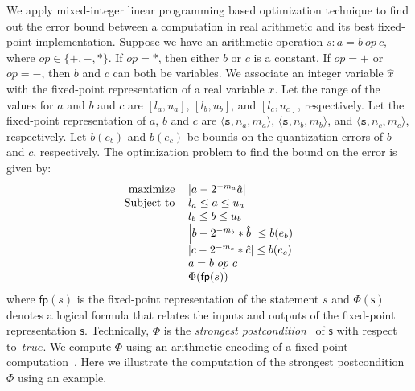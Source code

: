 \documentclass{amsart}
\numberwithin{equation}{section}
\def\set#1{{ \{ #1 \}}}
\def\tuple#1{{ \langle #1 \rangle}}
\def\true{{\mathit{true}}}
\begin{document}
We apply mixed-integer linear programming based optimization technique to find out the error bound
between a computation in real arithmetic and its best fixed-point implementation.
Suppose we have an arithmetic operation $s: a = b \ op \ c$, where $op \in \set{+,-,*}$. If $op = *$, then
either $b$ or $c$ is a constant. If $op = +$ or $op = -$, then $b$ and $c$ can both be variables. 
We associate an integer variable $\hat{x}$ with the fixed-point representation of a real variable $x$.
Let the range of the values for $a$ and $b$ and $c$
are $[l_a, u_a]$, $[l_b, u_b]$, and $[l_c, u_c]$, respectively. Let the fixed-point representation of 
$a$, $b$ and $c$ are $\tuple{\mathtt{s}, n_a,m_a}$, $\tuple{\mathtt{s}, n_b,m_b}$,  and $\tuple{\mathtt{s}, n_c,m_c}$, 
respectively. Let $b(e_b)$ and $b(e_c)$ be bounds on the quantization errors of $b$ and $c$, respectively.
The optimization problem to find the bound on the error is given by:
\begin{equation}
\label{opt_prob}
\begin{tabular}{rl}
maximize & $\left\vert a - 2^{-m_a} \hat{a}\right\vert$\\
Subject to & $l_a \le a \le u_a$\\
& $l_b \le b \le u_b$\\
& $\left\vert b - 2^{-m_b}*\hat{b}\right\vert \le b(e_b)$\\
& $\left\vert c - 2^{-m_c}*\hat{c}\right\vert \le b(e_c)$\\
& $a = b \ op \ c$ \\
& $\Phi(\mathsf{fp}(s))$
\end{tabular}
\end{equation}
where $\mathsf{fp}(s)$ is the fixed-point representation of the statement $s$
and 
$\Phi(\mathsf{s})$ denotes a logical formula that relates the inputs and outputs of the
fixed-point representation $\mathsf{s}$. Technically, $\Phi$ is the {\em strongest postcondition}~\cite{Winskel} of $\mathsf{s}$ with respect to\ $\true$. We compute $\Phi$ 
using an arithmetic encoding of a fixed-point computation~\cite{anta}. 
Here we illustrate the computation of the strongest
postcondition $\Phi$ using an example.
\end{document}
